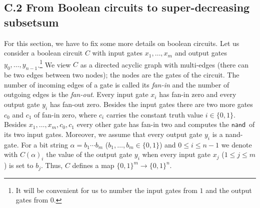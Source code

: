\documentclass[10pt,a4paper]{article}
\newcommand{\nand}{\ensuremath{\mathsf{nand}}}
\begin{document}
\subsection*{C.2 From Boolean circuits to super-decreasing subsetsum} \label{sec-circuits-subsetsum} 

For this section, we have to fix some more details on boolean circuits.
Let us consider a boolean circuit $C$ with input gates $x_1, \ldots, x_m$ 
and output gates $y_0, \ldots, y_{n-1}$.\footnote{It will be convenient for us to number the input gates from $1$ 
and the output gates from $0$.}
We view $C$ as a directed acyclic graph with multi-edges
(there can be two edges between two nodes); the nodes are the gates of the circuit.
The number of incoming edges of a gate is called its {\em fan-in} and the 
number of outgoing edges is the {\em fan-out}.
Every input gate $x_i$ has fan-in zero and every output gate $y_i$ has fan-out zero.
Besides the input gates there are two more gates $c_0$ and $c_1$ of fan-in zero, where
$c_i$ carries the constant truth value $i \in \{0,1\}$. Besides $x_1, \ldots, x_m, c_0, c_1$
every other gate has fan-in two and computes the \nand\ of its two input gates.
Moreover, we assume that every output gate $y_i$ is a {\sf nand}-gate.
For a bit string $\alpha = b_1 \cdots b_m$ ($b_1, \ldots, b_m \in \{0,1\}$) and $0 \leq i \leq n-1$
we denote with $C(\alpha)_i$ the value of the output gate $y_i$  when every input gate
$x_j$ ($1 \leq j \leq m$) is set to $b_j$. Thus, $C$ defines a map $\{0,1\}^m\to\{0,1\}^n$. 
\end{document}

